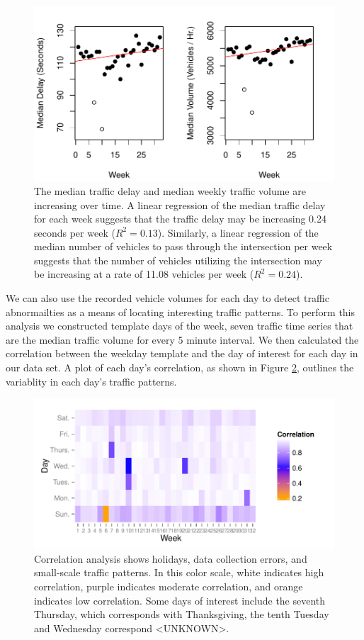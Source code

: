 \documentclass{report}
\begin{document}
\begin{figure}[H]
\centering

\includegraphics{upstat_report-VolumePlot}
\caption{ The median traffic delay and median weekly
traffic volume are increasing over time. A linear regression of the median
traffic delay for each week suggests that the traffic delay may be increasing
0.24 seconds per week
($R^2 = 0.13$). Similarly, a linear
regression of the median number of vehicles to pass through the intersection per
week suggests that the number of vehicles utilizing the intersection may be
increasing at a rate of 11.08 vehicles
per week ($R^2 = 0.24$).}
\label{trends}
\end{figure}

We can also use the recorded vehicle volumes for each day to detect traffic
abnormailties as a means of locating interesting traffic patterns. To perform this
analysis we constructed template days of the week, seven traffic time series that
are the median traffic volume for every 5 minute interval. We then calculated the
correlation between the weekday template and the day of interest for each day in
our data set. A plot of each day's correlation, as shown in Figure \ref{fig:correlation},
outlines the variablity in each day's traffic patterns.

\begin{figure}[h]
\centering
\includegraphics{upstat_report-006}
\caption{Correlation analysis shows holidays, data collection errors, and small-scale
traffic patterns. In this color scale, white indicates high correlation, purple
indicates moderate correlation, and orange indicates low correlation. Some days of
interest include the seventh Thursday, which corresponds with Thanksgiving, the
tenth Tuesday and Wednesday correspond <UNKNOWN>.}
\label{fig:correlation}
\end{figure}
\end{document}
